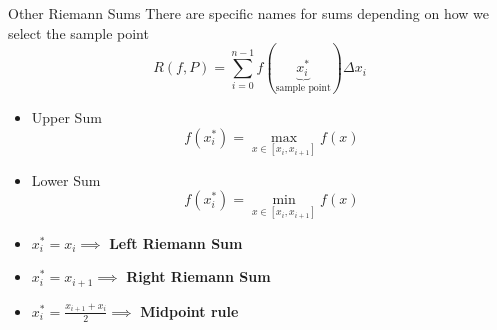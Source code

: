 \documentclass[10pt]{beamer}
\begin{document}
\begin{frame}{Other Riemann Sums}
There are specific names for sums depending on how we select the sample point 
    $$R(f,P) = \sum_{i=0}^{n-1} f(\underbrace{x^*_i}_{\text{sample point}}) \Delta x_i $$
\begin{itemize}
    \item Upper Sum 
    $$f(x^*_i) = \max_{x\in [x_i, x_{i+1}]} f(x)$$   
    \item Lower Sum
    $$f(x^*_i) = \min_{x\in [x_i, x_{i+1}]} f(x) $$  
    \item $x^*_i = x_i \implies $ \textbf{Left Riemann Sum}
    \item $x^*_i = x_{i+1} \implies $ \textbf{Right Riemann Sum}
    \item $x^*_i = \frac{x_{i+1}+x_{i}}{2} \implies $ \textbf{Midpoint rule}
\end{itemize}
\end{frame}
\end{document}

